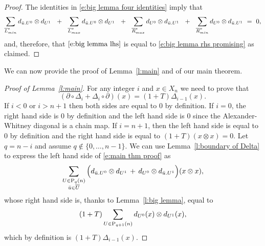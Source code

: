 \begin{proof}
	The identities in \eqref{e:big lemma four identities} imply that
	\begin{equation} \label{e:big lemma zero sum}
	\sum_{\overline{L}_{min}^{e}} d_{\bu.U^0} \otimes d_{U^1}\ \ +\ \
	\sum_{\overline{L}_{max}^{o}} d_{\bu.U^0} \otimes d_{U^1}\ \ +\ \
	\sum_{\overline{R}_{max}^{e}} d_{U^0} \otimes d_{\bu.U^1}\ \ +\ \ 
	\sum_{\overline{R}_{min}^{o}} d_{U^0} \otimes d_{\bu.U^1}\ =\ 0,
	\end{equation}
	and, therefore, that $\eqref{e:big lemma lhs}$ is equal to \eqref{e:big lemma rhs promising} as claimed.
\end{proof}

We can now provide the proof of Lemma~\ref{l:main} and of our main theorem.

\begin{proof}[Proof of Lemma~\ref{l:main}]
	For any integer $i$ and $x \in X_n$ we need to prove that
	\begin{equation} \label{e:main thm proof}
	(\partial \circ \Delta_{i} + \Delta_{i} \circ \partial)(x) = (1 + T) \Delta_{i-1}(x).
	\end{equation}
	If $i < 0$ or $i > n+1$ then both sides are equal to $0$ by definition.
	If $i = 0$, the right hand side is $0$ by definition and the left hand side is $0$ since the Alexander-Whitney diagonal is a chain map.
	If $i = n+1$, then the left hand side is equal to $0$ by definition and the right hand side is equal to $(1+T) (x \otimes x) = 0$.
	Let $q = n-i$ and assume $q \not\in \{0, \dots, n-1\}$.
	We can use Lemma~\ref{l:boundary of Delta} to express the left hand side of \eqref{e:main thm proof} as
	\begin{equation*}
	\sum_{\substack{U \in \P_{q}(n) \\ \bu \in \overline{U}}} \Big( d_{\bu.U^0} \otimes d_{U^1} \, + \, d_{U^0} \otimes d_{\bu.U^1} \Big) (x \otimes x),
	\end{equation*}
	whose right hand side is, thanks to Lemma~\ref{l:big lemma}, equal to
	\begin{equation*}
	(1+T) \sum_{U \in \P_{q+1}(n)} d_{U^0}(x) \otimes d_{U^1}(x),
	\end{equation*}
	which by definition is $(1+T)\Delta_{i-1}(x)$.
\end{proof}